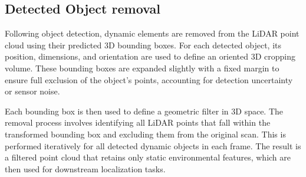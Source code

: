 \subsection{Detected Object removal }

Following object detection, dynamic elements are removed from the LiDAR point cloud using their predicted 3D bounding boxes. For each detected object, its position, dimensions, and orientation are used to define an oriented 3D cropping volume. These bounding boxes are expanded slightly with a fixed margin to ensure full exclusion of the object’s points, accounting for detection uncertainty or sensor noise.

Each bounding box is then used to define a geometric filter in 3D space. The removal process involves identifying all LiDAR points that fall within the transformed bounding box and excluding them from the original scan. This is performed iteratively for all detected dynamic objects in each frame. The result is a filtered point cloud that retains only static environmental features, which are then used for downstream localization tasks. 









